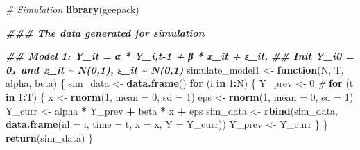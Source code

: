 \documentclass[
]{article}
\newenvironment{Shaded}{\begin{snugshade}}{\end{snugshade}}
\newcommand{\AttributeTok}[1]{\textcolor[rgb]{0.13,0.29,0.53}{#1}}
\newcommand{\CommentTok}[1]{\textcolor[rgb]{0.56,0.35,0.01}{\textit{#1}}}
\newcommand{\ControlFlowTok}[1]{\textcolor[rgb]{0.13,0.29,0.53}{\textbf{#1}}}
\newcommand{\DecValTok}[1]{\textcolor[rgb]{0.00,0.00,0.81}{#1}}
\newcommand{\DocumentationTok}[1]{\textcolor[rgb]{0.56,0.35,0.01}{\textbf{\textit{#1}}}}
\newcommand{\FunctionTok}[1]{\textcolor[rgb]{0.13,0.29,0.53}{\textbf{#1}}}
\newcommand{\NormalTok}[1]{#1}
\newcommand{\OtherTok}[1]{\textcolor[rgb]{0.56,0.35,0.01}{#1}}
\newcommand{\SpecialCharTok}[1]{\textcolor[rgb]{0.81,0.36,0.00}{\textbf{#1}}}
\begin{document}
\begin{Shaded}
\begin{Highlighting}[]
\CommentTok{\# Simulation}
\FunctionTok{library}\NormalTok{(geepack)}

\DocumentationTok{\#\#\# The data generated for simulation}

\DocumentationTok{\#\# Model 1: Y\_it = α * Y\_i,t{-}1 + β * x\_it + ε\_it, }
\DocumentationTok{\#\# Init Y\_i0 = 0，and x\_it \textasciitilde{} N(0,1), ε\_it \textasciitilde{} N(0,1)}
\NormalTok{simulate\_model1 }\OtherTok{\textless{}{-}} \ControlFlowTok{function}\NormalTok{(N, T, alpha, beta) \{}
\NormalTok{  sim\_data }\OtherTok{\textless{}{-}} \FunctionTok{data.frame}\NormalTok{()}
  \ControlFlowTok{for}\NormalTok{ (i }\ControlFlowTok{in} \DecValTok{1}\SpecialCharTok{:}\NormalTok{N) \{}
\NormalTok{    Y\_prev }\OtherTok{\textless{}{-}} \DecValTok{0}  \CommentTok{\# }
    \ControlFlowTok{for}\NormalTok{ (t }\ControlFlowTok{in} \DecValTok{1}\SpecialCharTok{:}\NormalTok{T) \{}
\NormalTok{      x }\OtherTok{\textless{}{-}} \FunctionTok{rnorm}\NormalTok{(}\DecValTok{1}\NormalTok{, }\AttributeTok{mean =} \DecValTok{0}\NormalTok{, }\AttributeTok{sd =} \DecValTok{1}\NormalTok{)}
\NormalTok{      eps }\OtherTok{\textless{}{-}} \FunctionTok{rnorm}\NormalTok{(}\DecValTok{1}\NormalTok{, }\AttributeTok{mean =} \DecValTok{0}\NormalTok{, }\AttributeTok{sd =} \DecValTok{1}\NormalTok{)}
\NormalTok{      Y\_curr }\OtherTok{\textless{}{-}}\NormalTok{ alpha }\SpecialCharTok{*}\NormalTok{ Y\_prev }\SpecialCharTok{+}\NormalTok{ beta }\SpecialCharTok{*}\NormalTok{ x }\SpecialCharTok{+}\NormalTok{ eps}
\NormalTok{      sim\_data }\OtherTok{\textless{}{-}} \FunctionTok{rbind}\NormalTok{(sim\_data, }\FunctionTok{data.frame}\NormalTok{(}\AttributeTok{id =}\NormalTok{ i, }\AttributeTok{time =}\NormalTok{ t, }\AttributeTok{x =}\NormalTok{ x, }\AttributeTok{Y =}\NormalTok{ Y\_curr))}
\NormalTok{      Y\_prev }\OtherTok{\textless{}{-}}\NormalTok{ Y\_curr}
\NormalTok{    \}}
\NormalTok{  \}}
  \FunctionTok{return}\NormalTok{(sim\_data)}
\NormalTok{\}}


\end{Highlighting}
\end{Shaded}
\end{document}

